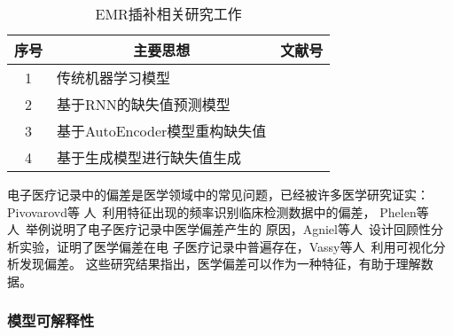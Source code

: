 \begin{table}
    \renewcommand\arraystretch{1.5}
    \begin{small}
        \caption{EMR插补相关研究工作}
        \label{tab:imputation}
        \begin{center}
            \begin{tabular}[c]{cll}
                \toprule
                \multicolumn{1}{c}{\textbf{序号}} & 
                \multicolumn{1}{c}{\textbf{主要思想}} &
                \multicolumn{1}{c}{\textbf{文献号}}\\
                \midrule
                1 & 传统机器学习模型 & \cite{zheng2017resolving}
                \cite{beaulieu2018characterizing} \cite{yang2018time} \cite{xu2019estimating} \cite{sterne2009multiple}
                \\
                2 & 基于RNN的缺失值预测模型 & 
                \cite{che2018recurrent} \cite{suo2019recurrent}
                ~\cite{cao2018brits} \\
                3 & 基于AutoEncoder模型重构缺失值 & \cite{beaulieu2017missing}
                \cite{costa2018missing} \\
                4 & 基于生成模型进行缺失值生成 & \cite{luo2018multivariate}
                \cite{luo20192} \cite{yoon2018gain} \cite{mattei2019miwae} \\
               \bottomrule
            \end{tabular}
        \end{center}
    \end{small}
\end{table}

电子医疗记录中的偏差是医学领域中的常见问题，已经被许多医学研究证实：Pivovarovd等
人~利用特征出现的频率识别临床检测数据中的偏差，
Phelen等人~举例说明了电子医疗记录中医学偏差产生的
原因，Agniel等人~设计回顾性分析实验，证明了医学偏差在电
子医疗记录中普遍存在，Vassy等人~利用可视化分析发现偏差。
这些研究结果指出，医学偏差可以作为一种特征，有助于理解数据。

{}

\subsubsection{模型可解释性}

